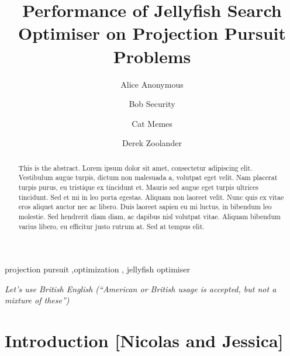 \documentclass[
  number,
  preprint,
  3p]{elsarticle}
\begin{document}
\begin{frontmatter}
\title{Performance of Jellyfish Search Optimiser on Projection Pursuit
Problems}
\author[1]{Alice Anonymous%
%
}
\author[2]{Bob Security%
%
}
\author[2]{Cat Memes%
%
}
\author[]{Derek Zoolander%
%
}






        
\begin{abstract}
This is the abstract. Lorem ipsum dolor sit amet, consectetur adipiscing
elit. Vestibulum augue turpis, dictum non malesuada a, volutpat eget
velit. Nam placerat turpis purus, eu tristique ex tincidunt et. Mauris
sed augue eget turpis ultrices tincidunt. Sed et mi in leo porta
egestas. Aliquam non laoreet velit. Nunc quis ex vitae eros aliquet
auctor nec ac libero. Duis laoreet sapien eu mi luctus, in bibendum leo
molestie. Sed hendrerit diam diam, ac dapibus nisl volutpat vitae.
Aliquam bibendum varius libero, eu efficitur justo rutrum at. Sed at
tempus elit.
\end{abstract}





\begin{keyword}
    projection pursuit \sep optimization \sep 
    jellyfish optimiser
\end{keyword}
\end{frontmatter}
    \ifdefined\Shaded\renewenvironment{Shaded}{\begin{tcolorbox}[breakable, enhanced, boxrule=0pt, frame hidden, borderline west={3pt}{0pt}{shadecolor}, interior hidden, sharp corners]}{\end{tcolorbox}}\fi

\emph{Let's use British English (``American or British usage is
accepted, but not a mixture of these'')}

\hypertarget{introduction-nicolas-and-jessica}{%
\section{Introduction {[}Nicolas and
Jessica{]}}\label{introduction-nicolas-and-jessica}}
\end{document}
